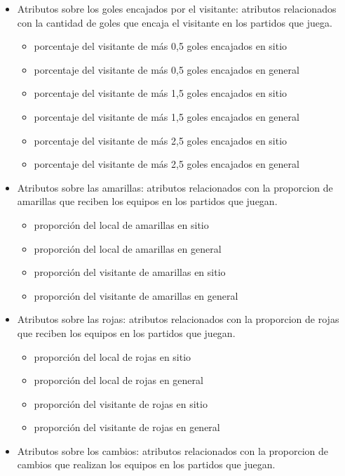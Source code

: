 \begin{itemize}
\begin{itemize}
    \end{itemize}
    \item Atributos sobre los goles encajados por el visitante: atributos relacionados con la cantidad de goles que encaja el visitante en los partidos que juega.
    \begin{itemize}
        \item porcentaje del visitante de más 0,5 goles encajados en sitio
        \item porcentaje del visitante de más 0,5 goles encajados en general
        \item porcentaje del visitante de más 1,5 goles encajados en sitio
        \item porcentaje del visitante de más 1,5 goles encajados en general
        \item porcentaje del visitante de más 2,5 goles encajados en sitio
        \item porcentaje del visitante de más 2,5 goles encajados en general
    \end{itemize}
    \item Atributos sobre las amarillas: atributos relacionados con la proporcion de amarillas que reciben los equipos en los partidos que juegan.
    \begin{itemize}
        \item proporción del local de amarillas en sitio
        \item proporción del local de amarillas en general
        \item proporción del visitante de amarillas en sitio
        \item proporción del visitante de amarillas en general
    \end{itemize}
    \item Atributos sobre las rojas: atributos relacionados con la proporcion de rojas que reciben los equipos en los partidos que juegan.
    \begin{itemize}
        \item proporción del local de rojas en sitio
        \item proporción del local de rojas en general
        \item proporción del visitante de rojas en sitio
        \item proporción del visitante de rojas en general
    \end{itemize}
    \item Atributos sobre los cambios: atributos relacionados con la proporcion de cambios que realizan los equipos en los partidos que juegan.

\end{itemize}

